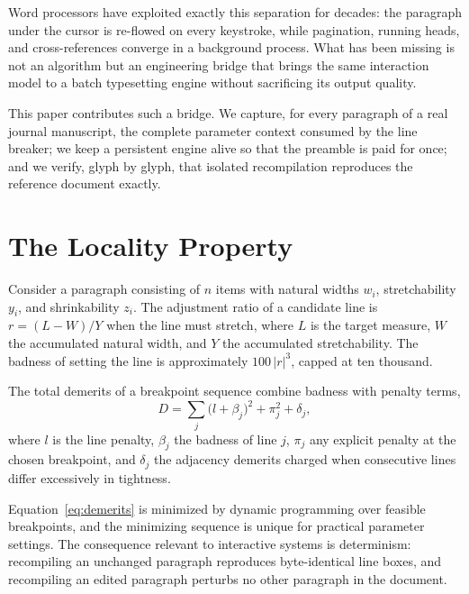 \documentclass[journal]{IEEEtran}
\begin{document}
\tagStructPara{}Word processors have exploited exactly this separation for decades: the
paragraph under the cursor is re-flowed on every keystroke, while
pagination, running heads, and cross-references converge in a background
process. What has been missing is not an algorithm but an engineering
bridge that brings the same interaction model to a batch typesetting
engine without sacrificing its output quality.\tagStructParaEnd{}%

\tagStructPara{}This paper contributes such a bridge. We capture, for every paragraph of a
real journal manuscript, the complete parameter context consumed by the
line breaker; we keep a persistent engine alive so that the preamble is
paid for once; and we verify, glyph by glyph, that isolated recompilation
reproduces the reference document exactly.\tagStructParaEnd{}%

\section{The Locality Property}

\tagStructPara{}Consider a paragraph consisting of $n$ items with natural widths $w_i$,
stretchability $y_i$, and shrinkability $z_i$. The adjustment ratio of a
candidate line is $r = (L - W)/Y$ when the line must stretch, where $L$ is
the target measure, $W$ the accumulated natural width, and $Y$ the
accumulated stretchability. The badness of setting the line is
approximately $100\,|r|^3$, capped at ten thousand.\tagStructParaEnd{}%

\tagStructPara{}The total demerits of a breakpoint sequence combine badness with penalty
terms,
\begin{equation}
D = \sum_{j} \bigl( l + \beta_j \bigr)^2 + \pi_j^2 + \delta_j,
\label{eq:demerits}
\end{equation}
where $l$ is the line penalty, $\beta_j$ the badness of line $j$, $\pi_j$
any explicit penalty at the chosen breakpoint, and $\delta_j$ the adjacency
demerits charged when consecutive lines differ excessively in tightness.\tagStructParaEnd{}%

\tagStructPara{}Equation~\eqref{eq:demerits} is minimized by dynamic programming over
feasible breakpoints, and the minimizing sequence is unique for practical
parameter settings. The consequence relevant to interactive systems is
determinism: recompiling an unchanged paragraph reproduces byte-identical
line boxes, and recompiling an edited paragraph perturbs no other
paragraph in the document.\tagStructParaEnd{}%
\end{document}
